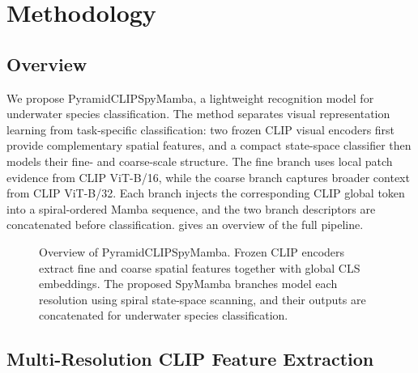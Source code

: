 \section{Methodology}
\label{sec:method}

\subsection{Overview}

We propose PyramidCLIPSpyMamba, a lightweight recognition model for underwater species classification. The method separates visual representation learning from task-specific classification: two frozen CLIP visual encoders first provide complementary spatial features, and a compact state-space classifier then models their fine- and coarse-scale structure. The fine branch uses local patch evidence from CLIP ViT-B/16, while the coarse branch captures broader context from CLIP ViT-B/32. Each branch injects the corresponding CLIP global token into a spiral-ordered Mamba sequence, and the two branch descriptors are concatenated before classification.  gives an overview of the full pipeline.

\begin{figure}[tb]
  \centering
  \caption{Overview of PyramidCLIPSpyMamba. Frozen CLIP encoders extract fine and coarse spatial features together with global CLS embeddings. The proposed SpyMamba branches model each resolution using spiral state-space scanning, and their outputs are concatenated for underwater species classification.}
  \label{fig:architecture}
\end{figure}

\subsection{Multi-Resolution CLIP Feature Extraction}

